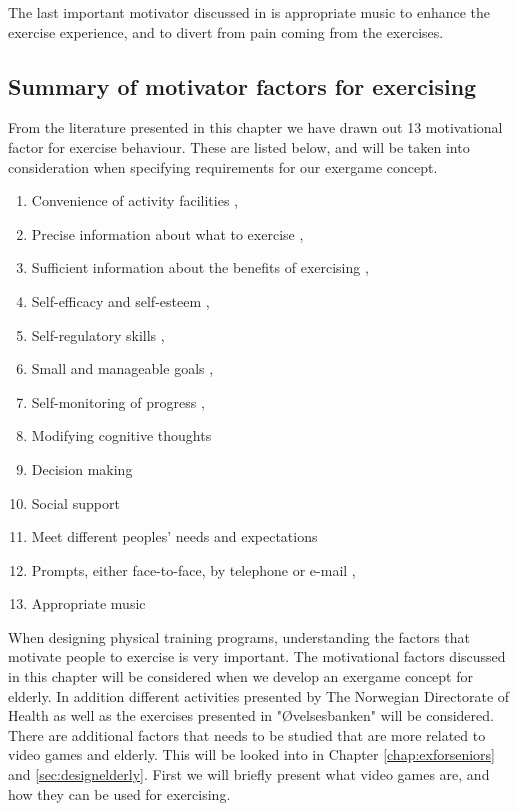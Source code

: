 The last important motivator discussed in \cite{schutzer} is appropriate music to enhance the exercise experience, and to divert from pain coming from the exercises. 


\subsection{Summary of motivator factors for exercising}
\label{subsec:motivator}

From the literature presented in this chapter we have drawn out 13 motivational factor for exercise behaviour. These are listed below, and will be taken into consideration when specifying requirements for our exergame concept. 

\begin{enumerate}[{m}.1]
\item Convenience of activity facilities \cite{chao}, \cite{schutzer}
\item Precise information about what to exercise \cite{chao}, \cite{schutzer}
\item Sufficient information about the benefits of exercising \cite{chao}, \cite{schutzer}
\item Self-efficacy and self-esteem \cite{schutzer}, \cite{white}
\item Self-regulatory skills \cite{chao}, \cite{schutzer}
\item Small and manageable goals \cite{chao},\cite{schutzer}
\item Self-monitoring of progress \cite{chao},\cite{schutzer}
\item Modifying cognitive thoughts \cite{chao}
\item Decision making \cite{chao}
\item Social support \cite{chao}
\item Meet different peoples' needs and expectations \cite{chao}
\item Prompts, either face-to-face, by telephone or e-mail \cite{chao},\cite{schutzer}
\item Appropriate music \cite{schutzer}
\end{enumerate} 

\bigskip

When designing physical training programs, understanding the factors that motivate people to exercise is very important. The motivational factors discussed in this chapter will be considered when we develop an exergame concept for elderly. In addition different activities presented by The Norwegian Directorate of Health as well as the exercises presented in "Øvelsesbanken" will be considered. There are additional factors that needs to be studied that are more related to video games and elderly. This will be looked into in Chapter \ref{chap:exforseniors} and \ref{sec:designelderly}. First we will briefly present what video games are, and how they can be used for exercising. 




